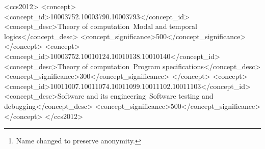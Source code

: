 \documentclass[sigplan,nonacm,10pt]{acmart}
\makeatletter
\newcommand{\AnonyNoteFirst}[0]{%
  \if@ACM@anonymous%
  \footnote{Name changed to preserve anonymity.\label{anonynote}}%
  \else\fi%
}
\newcommand{\AnonyNote}[0]{%
\if@ACM@anonymous%
\footref{anonynote}%
\else%
\fi%
}
\newcommand{\Quickstrom}[0]{%
  \if@ACM@anonymous%
  \textsc{Bl\aa{}haj}%
  \else%
  Quickstrom%
  \fi\xspace}
\newcommand{\Specstrom}[0]{%
  \if@ACM@anonymous%
  \textsc{Billy}%
  \else%
  Specstrom%
  \fi\xspace}
\newcommand{\QuickLTL}[0]{%
    \if@ACM@anonymous%
    \textsc{Kallax}%
    \else%
    QuickLTL%
    \fi\xspace}
\makeatother
\begin{document}
\begin{abstract}
We present \Quickstrom\AnonyNoteFirst, a property-based testing system for acceptance testing of interactive applications. Using \Quickstrom, programmers can specify the behaviour of web applications
as properties in our testing-oriented dialect of Linear Temporal Logic (LTL) called \QuickLTL\AnonyNote, and then automatically test their application against the given
specification with hundreds of automatically generated interactions. \QuickLTL extends existing finite variants of LTL for the testing use-case, determining likely outcomes from partial traces whose minimum length is
itself determined by the LTL formula. This temporal logic is embedded in our specification language,
\Specstrom\AnonyNote, which is designed to be approachable to web programmers, expressive for writing specifications, and easy to analyse.
Because \Quickstrom tests only user-facing behaviour, it is agnostic to the implementation language of the system under test.
We therefore formally specify and test many implementations of the popular TodoMVC benchmark, used for evaluation and comparison across various web frontend frameworks and languages.
Our tests uncovered bugs in almost half of the available implementations.
\end{abstract}


\begin{CCSXML}
  <ccs2012>
     <concept>
         <concept_id>10003752.10003790.10003793</concept_id>
         <concept_desc>Theory of computation~Modal and temporal logics</concept_desc>
         <concept_significance>500</concept_significance>
         </concept>
     <concept>
         <concept_id>10003752.10010124.10010138.10010140</concept_id>
         <concept_desc>Theory of computation~Program specifications</concept_desc>
         <concept_significance>300</concept_significance>
         </concept>
     <concept>
         <concept_id>10011007.10011074.10011099.10011102.10011103</concept_id>
         <concept_desc>Software and its engineering~Software testing and debugging</concept_desc>
         <concept_significance>500</concept_significance>
         </concept>
   </ccs2012>
\end{CCSXML}
\end{document}
